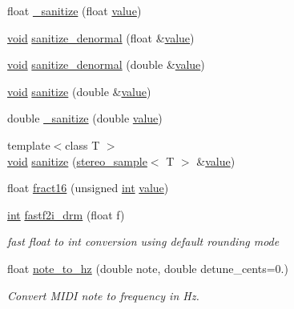 \begin{DoxyCompactItemize}
\item 
float \hyperlink{namespacedsp_a0c2863a05929fbfdf1c7475313192636}{\+\_\+sanitize} (float \hyperlink{tk_8h_a177a0765f574ef6642002696d9cd82d0}{value})
\item 
\hyperlink{tk_8h_aba408b7cd755a96426e004c015f5de8e}{void} \hyperlink{namespacedsp_ac5c03456d5d02aab8d670977d7e16f0f}{sanitize\+\_\+denormal} (float \&\hyperlink{tk_8h_a177a0765f574ef6642002696d9cd82d0}{value})
\item 
\hyperlink{tk_8h_aba408b7cd755a96426e004c015f5de8e}{void} \hyperlink{namespacedsp_ab5c1632750ec776a122904f6be27e200}{sanitize\+\_\+denormal} (double \&\hyperlink{tk_8h_a177a0765f574ef6642002696d9cd82d0}{value})
\item 
\hyperlink{tk_8h_aba408b7cd755a96426e004c015f5de8e}{void} \hyperlink{namespacedsp_aa9b71af18baffe0cdda2cf64b15727e8}{sanitize} (double \&\hyperlink{tk_8h_a177a0765f574ef6642002696d9cd82d0}{value})
\item 
double \hyperlink{namespacedsp_a3f42698c5c80f560180882cd02ca1eda}{\+\_\+sanitize} (double \hyperlink{tk_8h_a177a0765f574ef6642002696d9cd82d0}{value})
\item 
{\footnotesize template$<$class T $>$ }\\\hyperlink{tk_8h_aba408b7cd755a96426e004c015f5de8e}{void} \hyperlink{namespacedsp_ab2b42db4ce9ee06d121bbaefa42f6303}{sanitize} (\hyperlink{structdsp_1_1stereo__sample}{stereo\+\_\+sample}$<$ T $>$ \&\hyperlink{tk_8h_a177a0765f574ef6642002696d9cd82d0}{value})
\item 
float \hyperlink{namespacedsp_a934554c35e4d3e171cea6a1236fa6651}{fract16} (unsigned \hyperlink{tk_8h_a83f82f76e7fed06f4c49d2db94028a6d}{int} \hyperlink{tk_8h_a177a0765f574ef6642002696d9cd82d0}{value})
\item 
\hyperlink{tk_8h_a83f82f76e7fed06f4c49d2db94028a6d}{int} \hyperlink{namespacedsp_aa7895889a13d54d21ea6855e30cc4568}{fastf2i\+\_\+drm} (float f)
\begin{DoxyCompactList}\small\item\em fast float to int conversion using default rounding mode \end{DoxyCompactList}\item 
float \hyperlink{namespacedsp_ae051685d0a6b779c924320f3b7bc386b}{note\+\_\+to\+\_\+hz} (double note, double detune\+\_\+cents=0.)
\begin{DoxyCompactList}\small\item\em Convert M\+I\+DI note to frequency in Hz. \end{DoxyCompactList}\item 

\end{DoxyCompactItemize}
